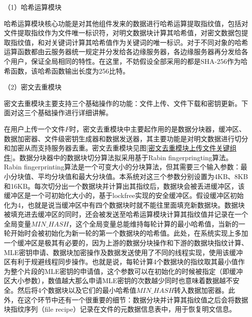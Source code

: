 \documentclass[promaster]{thesis-uestc}
\begin{document}
（1）哈希运算模块

哈希运算模块核心功能是对其他组件发来的数据进行哈希运算提取指纹值，包括对文件提取指纹作为文件唯一标识符，对明文数据块计算其哈希值，对密文数据包提取指纹值，和对关键词计算其哈希值作为关键词的唯一标识。对于不同对象的哈希运算函数都由云服务器统一规定并分发给各边缘服务器，各边缘服务器再分发给各个用户，保证全局相同的特性。在这里，不妨假设全部采用的都是SHA-256作为哈希函数，该哈希函数输出长度为256比特。

（2）密文去重模块

密文去重模块主要支持三个基础操作的功能：文件上传、文件下载和密钥更新。下面对这三个基础操作进行详细讲解。

在用户上传一个文件$F$时，密文去重模块中主要起作用的是数据分块器，缓冲区、数据加密器、文件级密钥生成器和数据发送器，其主要功能是对明文数据进行切分和加密从而支持服务器去重。密文去重模块见图\ref{密文去重模块上传文件关键组件}。数据分块器中的数据块切分算法拟采用基于Rabin fingerpringting算法。Rabin fingerprinting算法是一个可变大小的分块算法，但其需要三个输入参数：最小分块值、平均分块值和最大分块值。本系统对这三个参数分别设置为4KB、8KB和16KB。每次切分出一个数据块并计算出其指纹后，数据块会被丢进缓冲区，该缓冲区是一个可初始化大小的，基于lockfree实现的安全缓冲区。假设缓冲区初始化为4，也就是说当缓冲区中有四个数据块时就不能往里面填充新数据块。数据块被填充进去缓冲区的同时，还会被发送至哈希运算模块计算其指纹值并记录在一个全局变量$MIN\_HASH$，这个全局变量总能维持每轮计算的最小哈希值，当新的一轮开始时会被初始化为新一轮的第一个数据块的哈希值。此处，在系统实现上多加一个缓冲区是极其有必要的，因为上游的数据分块操作和下游的数据块指纹计算、MLE密钥申请、数据块加密操作及数据发送使用了不同的线程实现，使用该缓冲区有利于规避线程同步操作。也就是说，每轮计算4个数据块的指纹取其最小值作为整个片段的MLE密钥的申请值，这个参数可以在初始化的时候被指定（即缓冲区大小参数），数值越大那么申请MLE密钥的次数越少同时也意味着数据越不安全。然后将4个数据块以及它们的最小哈希值$MIN\_HASH$转入数据加密器。此外，在这个环节中还有一个很重要的细节：数据分块并计算其指纹值之后会将数据块指纹序列（file recipe）记录在文件的元数据信息表中，用于恢复明文信息。
\end{document}
